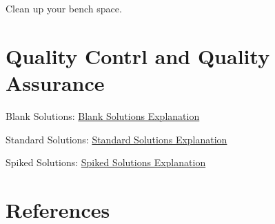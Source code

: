 \documentclass[12pt]{../SOP3_alpha}
\begin{document}
\NP Clean up your bench space.

\section{Quality Contrl and Quality Assurance}

\NP Blank Solutions: \href{https://en.wikipedia.org/wiki/Blank_(solution)}{Blank Solutions Explanation}

\NP Standard Solutions: \href{https://en.wikipedia.org/wiki/Standard_solution}{Standard Solutions Explanation}

\NP Spiked Solutions: \href{}{Spiked Solutions Explanation}



\section{References}


\end{document}
